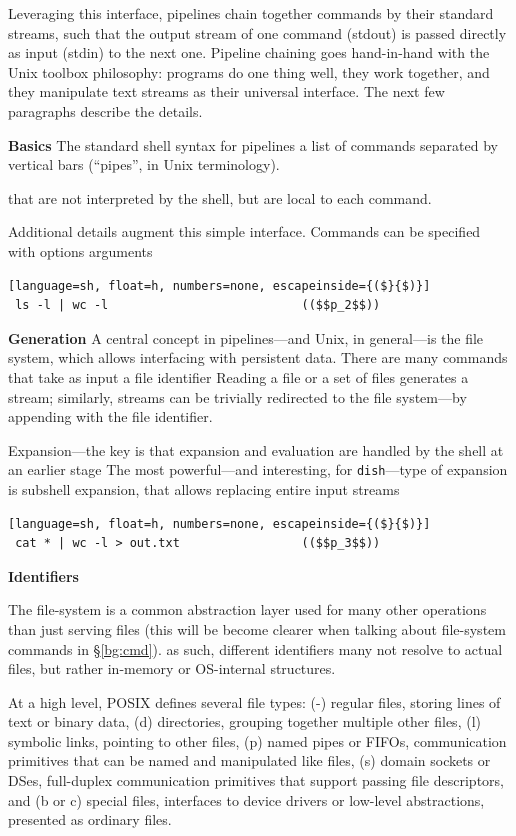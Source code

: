\documentclass[sigplan,10pt,review,anonymous]{acmart}
\newcommand{\heading}[1]{\vspace{4pt}\noindent\textbf{#1}\enspace}
\newcommand{\ttt}[1]{\texttt{\small #1}}
\begin{document}
Leveraging this interface, pipelines chain together commands by their standard streams, such that the output stream of one command (stdout) is passed directly as input (stdin) to the next one.
Pipeline chaining goes hand-in-hand with the Unix toolbox philosophy: 
  programs do one thing well, they work together, and they manipulate text streams as their universal interface.
The next few paragraphs describe the details.

\heading{Basics}
The standard shell syntax for pipelines a list of commands separated by vertical bars (``pipes'', in Unix terminology).

that are not interpreted by the shell, but are local to each command.

Additional details augment this simple interface.
Commands can be specified with options arguments


\begin{lstlisting}[language=sh, float=h, numbers=none, escapeinside={($}{$)}]
 ls -l | wc -l                           (($$p_2$$))
\end{lstlisting}

\heading{Generation}
A central concept in pipelines---and Unix, in general---is the file system, which allows interfacing with persistent data.
There are many commands that take as input a file identifier 
Reading a file or a set of files generates a stream; 
  similarly, streams can be trivially redirected to the file system---by appending with the file identifier.

Expansion---the key is that expansion and evaluation are handled by the shell at an earlier stage 
The most powerful---and interesting, for \ttt{dish}---type of expansion is subshell expansion, that allows replacing entire input streams 


\begin{lstlisting}[language=sh, float=h, numbers=none, escapeinside={($}{$)}]
 cat * | wc -l > out.txt                 (($$p_3$$))
\end{lstlisting}

\heading{Identifiers}

The file-system is a common abstraction layer used for many other operations than just serving files (this will be become clearer when talking about file-system commands in \S\ref{bg:cmd}).
as such, different identifiers many not resolve to actual files, but rather in-memory or OS-internal structures.

At a high level, POSIX defines several file types:
(-) regular files, storing lines of text or binary data,
(d) directories, grouping together multiple other files,
(l) symbolic links, pointing to other files,
(p) named pipes or FIFOs, communication primitives that can be named and manipulated like files,
(s) domain sockets or DSes, full-duplex communication primitives that support passing file descriptors, and
(b or c) special files, interfaces to device drivers or low-level abstractions, presented as ordinary files.
\end{document}
